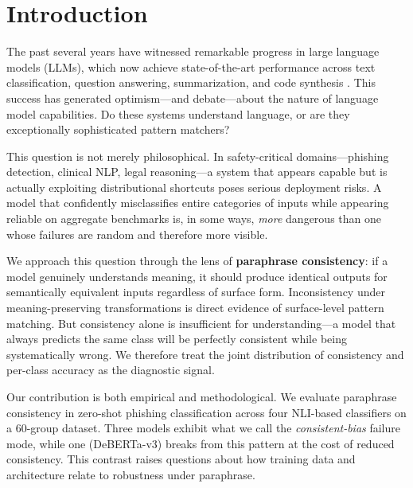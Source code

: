 \documentclass[11pt]{article}
\begin{document}
\section{Introduction}

The past several years have witnessed remarkable progress in large language models (LLMs), which now achieve state-of-the-art performance across text classification, question answering, summarization, and code synthesis \citep{brown2020language,wei2022chain,chowdhery2022palm,touvron2023llama}. This success has generated optimism---and debate---about the nature of language model capabilities. Do these systems understand language, or are they exceptionally sophisticated pattern matchers?

This question is not merely philosophical. In safety-critical domains---phishing detection, clinical NLP, legal reasoning---a system that appears capable but is actually exploiting distributional shortcuts poses serious deployment risks. A model that confidently misclassifies entire categories of inputs while appearing reliable on aggregate benchmarks is, in some ways, \textit{more} dangerous than one whose failures are random and therefore more visible.

We approach this question through the lens of \textbf{paraphrase consistency}: if a model genuinely understands meaning, it should produce identical outputs for semantically equivalent inputs regardless of surface form. Inconsistency under meaning-preserving transformations is direct evidence of surface-level pattern matching. But consistency alone is insufficient for understanding---a model that always predicts the same class will be perfectly consistent while being systematically wrong. We therefore treat the joint distribution of consistency and per-class accuracy as the diagnostic signal.

Our contribution is both empirical and methodological. We evaluate paraphrase consistency in zero-shot phishing classification across four NLI-based classifiers on a 60-group dataset. Three models exhibit what we call the \textit{consistent-bias} failure mode, while one (DeBERTa-v3) breaks from this pattern at the cost of reduced consistency. This contrast raises questions about how training data and architecture relate to robustness under paraphrase.
\end{document}
